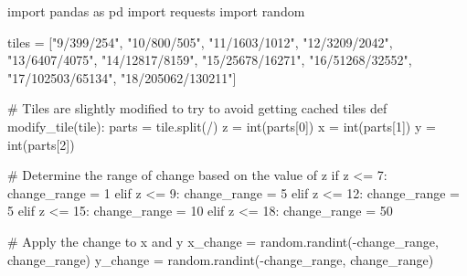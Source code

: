 \documentclass[
  oneside,
  open=any]{scrbook}
\newenvironment{Shaded}{\begin{snugshade}}{\end{snugshade}}
\newcommand{\BuiltInTok}[1]{\textcolor[rgb]{0.00,0.23,0.31}{#1}}
\newcommand{\CommentTok}[1]{\textcolor[rgb]{0.37,0.37,0.37}{#1}}
\newcommand{\ControlFlowTok}[1]{\textcolor[rgb]{0.00,0.23,0.31}{#1}}
\newcommand{\DecValTok}[1]{\textcolor[rgb]{0.68,0.00,0.00}{#1}}
\newcommand{\ImportTok}[1]{\textcolor[rgb]{0.00,0.46,0.62}{#1}}
\newcommand{\KeywordTok}[1]{\textcolor[rgb]{0.00,0.23,0.31}{#1}}
\newcommand{\NormalTok}[1]{\textcolor[rgb]{0.00,0.23,0.31}{#1}}
\newcommand{\OperatorTok}[1]{\textcolor[rgb]{0.37,0.37,0.37}{#1}}
\newcommand{\StringTok}[1]{\textcolor[rgb]{0.13,0.47,0.30}{#1}}
\begin{document}
\begin{Shaded}
\begin{Highlighting}[]
\ImportTok{import}\NormalTok{ pandas }\ImportTok{as}\NormalTok{ pd}
\ImportTok{import}\NormalTok{ requests}
\ImportTok{import}\NormalTok{ random}

\NormalTok{tiles }\OperatorTok{=}\NormalTok{ [}\StringTok{"9/399/254"}\NormalTok{, }\StringTok{"10/800/505"}\NormalTok{, }\StringTok{"11/1603/1012"}\NormalTok{,  }\StringTok{"12/3209/2042"}\NormalTok{, }
\StringTok{"13/6407/4075"}\NormalTok{, }\StringTok{"14/12817/8159"}\NormalTok{, }\StringTok{"15/25678/16271"}\NormalTok{, }\StringTok{"16/51268/32552"}\NormalTok{, }
\StringTok{"17/102503/65134"}\NormalTok{, }\StringTok{"18/205062/130211"}\NormalTok{]}

\CommentTok{\# Tiles are slightly modified to try to avoid getting cached tiles}
\KeywordTok{def}\NormalTok{ modify\_tile(tile):}
\NormalTok{    parts }\OperatorTok{=}\NormalTok{ tile.split(}\StringTok{\textquotesingle{}/\textquotesingle{}}\NormalTok{)}
\NormalTok{    z }\OperatorTok{=} \BuiltInTok{int}\NormalTok{(parts[}\DecValTok{0}\NormalTok{])}
\NormalTok{    x }\OperatorTok{=} \BuiltInTok{int}\NormalTok{(parts[}\DecValTok{1}\NormalTok{])}
\NormalTok{    y }\OperatorTok{=} \BuiltInTok{int}\NormalTok{(parts[}\DecValTok{2}\NormalTok{])}

    \CommentTok{\# Determine the range of change based on the value of z}
    \ControlFlowTok{if}\NormalTok{ z }\OperatorTok{\textless{}=} \DecValTok{7}\NormalTok{:}
\NormalTok{        change\_range }\OperatorTok{=} \DecValTok{1}
    \ControlFlowTok{elif}\NormalTok{ z }\OperatorTok{\textless{}=} \DecValTok{9}\NormalTok{:}
\NormalTok{        change\_range }\OperatorTok{=} \DecValTok{5}
    \ControlFlowTok{elif}\NormalTok{ z }\OperatorTok{\textless{}=} \DecValTok{12}\NormalTok{:}
\NormalTok{        change\_range }\OperatorTok{=} \DecValTok{5}
    \ControlFlowTok{elif}\NormalTok{ z }\OperatorTok{\textless{}=} \DecValTok{15}\NormalTok{:}
\NormalTok{        change\_range }\OperatorTok{=} \DecValTok{10}
    \ControlFlowTok{elif}\NormalTok{ z }\OperatorTok{\textless{}=} \DecValTok{18}\NormalTok{:}
\NormalTok{        change\_range }\OperatorTok{=} \DecValTok{50}

    \CommentTok{\# Apply the change to x and y}
\NormalTok{    x\_change }\OperatorTok{=}\NormalTok{ random.randint(}\OperatorTok{{-}}\NormalTok{change\_range, change\_range)}
\NormalTok{    y\_change }\OperatorTok{=}\NormalTok{ random.randint(}\OperatorTok{{-}}\NormalTok{change\_range, change\_range)}


\end{Highlighting}
\end{Shaded}
\end{document}
